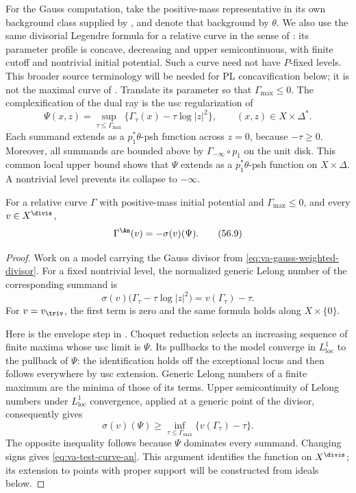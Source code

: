 For the Gauss computation, take the positive-mass representative
in its own background class supplied by ,
and denote that background by $\theta$.
We also use the same divisorial Legendre formula for a relative curve
in the sense of \cite[Section~2.2]{DXZ23}: its parameter profile is
concave, decreasing and upper semicontinuous, with finite cutoff and
nontrivial initial potential. Such a curve need not have $P$-fixed
levels. This broader source terminology will be needed for PL
concavification below; it is not the maximal curve of
.
Translate its parameter so that $\Gamma_{\max}\leq0$.
The complexification of the dual ray is the usc regularization of
\[
 \Psi(x,z)
  =\sup_{\tau\leq\Gamma_{\max}}
       \{\Gamma_\tau(x)-\tau\log|z|^2\},
 \qquad (x,z)\in X\times\Delta^*.
\tag{56.8}\label{eq:va-complexification}
\]
Each summand extends as a $p_1^*\theta$-psh function across $z=0$,
because $-\tau\geq0$. Moreover, all summands are bounded above by
$\Gamma_{-\infty}\circ p_1$ on the unit disk. This common local upper
bound shows that $\Psi$ extends as a $p_1^*\theta$-psh function on
$X\times\Delta$. A nontrivial level prevents its collapse to
$-\infty$.

\begin{proposition}\label{prop:va-gauss-identity}
For a relative curve $\Gamma$ with positive-mass initial potential
and $\Gamma_{\max}\leq0$, and every $v\in X^{\divis}$,
\[
                       \Gamma^{\An}(v)=-\sigma(v)(\Psi).
\tag{56.9}\label{eq:va-gauss-identity}
\]
\end{proposition}

\begin{proof}
Work on a model carrying the Gauss divisor from
\eqref{eq:va-gauss-weighted-divisor}. For a fixed nontrivial level,
the normalized generic Lelong number of the corresponding summand is
\[
 \sigma(v)\bigl(\Gamma_\tau-\tau\log|z|^2\bigr)
                         =v(\Gamma_\tau)-\tau.
\]
For $v=v_{\triv}$, the first term is zero and the same formula holds
along $X\times\{0\}$.

Here is the envelope step in \cite[Proposition~3.1]{DXZ23}.
Choquet reduction selects an increasing sequence of finite maxima
whose usc limit is $\Psi$. Its pullbacks to the model converge in
$L^1_{\mathrm{loc}}$ to the pullback of $\Psi$: the identification
holds off the exceptional locus and then follows everywhere by usc
extension. Generic Lelong numbers of a finite maximum are the minima
of those of its terms. Upper semicontinuity of Lelong numbers under
$L^1_{\mathrm{loc}}$ convergence, applied at a generic point of the
divisor, consequently gives
\[
 \sigma(v)(\Psi)\geq
       \inf_{\tau\leq\Gamma_{\max}}
          \{v(\Gamma_\tau)-\tau\}.
\]
The opposite inequality follows because $\Psi$ dominates every
summand. Changing signs gives \eqref{eq:va-test-curve-an}.
This argument identifies the function on $X^{\divis}$; its extension
to points with proper support will be constructed from ideals below.
\end{proof}

